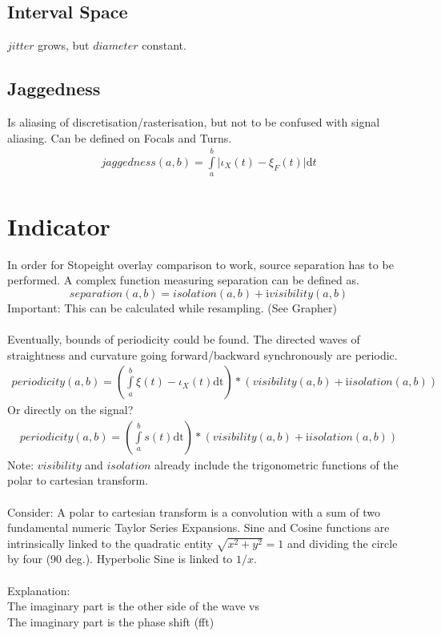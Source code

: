\documentclass{report}
\begin{document}
\subsection*{Interval Space}
$jitter$ grows, but $diameter$ constant.

\subsection{Jaggedness}
Is aliasing of discretisation/rasterisation, but not to be confused with signal aliasing. Can be defined on Focals and Turns.
\begin{align}
jaggedness(a,b)=\int \limits _{a}^{b} \lvert \iota_{X}(t)-\xi_{F}(t)\rvert \mathrm{d}t
\end{align}

\section{Indicator}
In order for Stopeight overlay comparison to work, source separation has to be performed. A complex function measuring separation can be defined as.
\begin{equation}
separation(a,b) = isolation(a,b) + \mathrm{i} visibility(a,b)
\end{equation}
Important: This can be calculated while resampling. (See Grapher)\\\\
Eventually, bounds of periodicity could be found. The directed waves of straightness and curvature going forward/backward synchronously are periodic.
\begin{align}
periodicity(a,b) =  (\int \limits _{a}^{b} \xi(t)-\iota_{X}(t) \mathrm{dt}) *(visibility(a,b) +\mathrm{i} isolation(a,b))
\end{align}
Or directly on the signal?
\begin{align}
periodicity(a,b) =  (\int \limits _{a}^{b} s(t) \mathrm{dt}) *(visibility(a,b) +\mathrm{i} isolation(a,b))
\end{align}
Note: $visibility$ and $isolation$ already include the trigonometric functions of the polar to cartesian transform.\\\\
Consider: A polar to cartesian transform is a convolution with a sum of two fundamental numeric Taylor Series Expansions. Sine and Cosine functions are intrinsically linked to the quadratic entity $\sqrt{x^2 + y^2} =1$ and dividing the circle by four (90 deg.). Hyperbolic Sine is linked to $1/x$.\\\\
Explanation:\\
The imaginary part is the other side of the wave vs\\
The imaginary part is the phase shift (fft)
\end{document}
